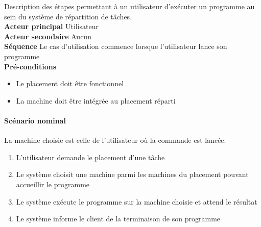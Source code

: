     Description des étapes permettant à un utilisateur d'exécuter un
    programme au sein du système de répartition de tâches. \\
    
    \noindent
    {\bf Acteur principal} Utilisateur \\
    {\bf Acteur secondaire} Aucun \\
    {\bf Séquence} Le cas d'utilisation commence lorsque l'utilisateur
      lance son programme \\
    {\bf Pré-conditions} \hfill
    \begin{itemize}
      \item Le placement doit être fonctionnel
      \item La machine doit être intégrée au placement réparti
    \end{itemize}
        
    \paragraph{Scénario nominal} La machine choisie est celle de
      l'utilisateur où la commande est lancée.

      \begin{enumerate}
        \item L'utilisateur demande le placement d'une tâche
        \item Le système choisit une machine parmi les machines du
            placement pouvant accueillir le programme
        \item Le système exécute le programme sur la machine choisie et attend le résultat
        \item Le système informe le client de la terminaison de son programme
      \end{enumerate}

